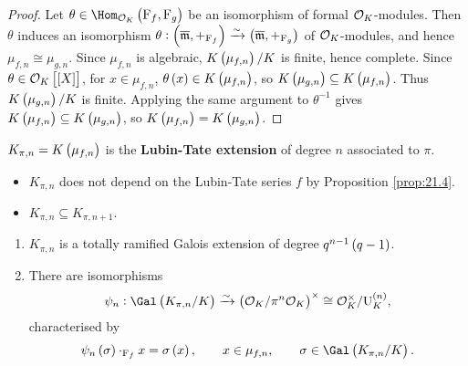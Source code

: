 \begin{proof}
Let $ \theta \in \Hom_{\OOO_K}\br{\F_f, \F_g} $ be an isomorphism of formal $ \mathcal{O}_K $-modules. Then $ \theta $ induces an isomorphism $ \theta : \br{\overline{\mmm}, +_{\F_f}} \xrightarrow{\sim} \br{\overline{\mmm}, +_{\F_g}} $ of $ \mathcal{O}_K $-modules, and hence $ \mu_{f, n} \cong \mu_{g, n} $. Since $ \mu_{f, n} $ is algebraic, $ K\br{\mu_{f, n}} / K $ is finite, hence complete. Since $ \theta \in \OOO_K\sbr{\sbr{X}} $, for $ x \in \mu_{f, n} $, $ \theta\br{x} \in K\br{\mu_{f, n}} $, so $ K\br{\mu_{g, n}} \subseteq K\br{\mu_{f, n}} $. Thus $ K\br{\mu_{g, n}} / K $ is finite. Applying the same argument to $ \theta^{-1} $ gives $ K\br{\mu_{f, n}} \subseteq K\br{\mu_{g, n}} $, so $ K\br{\mu_{f, n}} = K\br{\mu_{g, n}} $.
\end{proof}

\begin{definition}
$ K_{\pi, n} = K\br{\mu_{f, n}} $ is the \textbf{Lubin-Tate extension} of degree $ n $ associated to $ \pi $.
\end{definition}

\begin{remark*}
\hfill
\begin{itemize}
\item $ K_{\pi, n} $ does not depend on the Lubin-Tate series $ f $ by Proposition \ref{prop:21.4}.
\item $ K_{\pi, n} \subseteq K_{\pi, n + 1} $.
\end{itemize}
\end{remark*}


\begin{theorem}
\hfill
\begin{enumerate}
\item $ K_{\pi, n} $ is a totally ramified Galois extension of degree $ q^{n - 1}\br{q - 1} $.
\item There are isomorphisms
$$ \psi_n : \Gal\br{K_{\pi, n} / K} \xrightarrow{\sim} \br{\OOO_K / \pi^n\OOO_K}^\times \cong \OOO_K^\times / \U_K^{\br{n}}, $$
characterised by
\begin{equation}
\label{eq:6}
\psi_n\br{\sigma} \cdot_{\F_f} x = \sigma\br{x}, \qquad x \in \mu_{f, n}, \qquad \sigma \in \Gal\br{K_{\pi, n} / K}.
\end{equation}
\end{enumerate}
\end{theorem}

